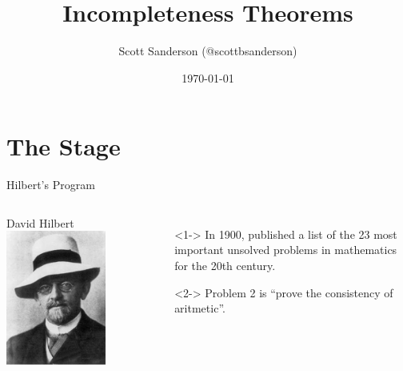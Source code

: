 \documentclass{beamer}
\title{\godels{} Incompleteness Theorems}
\date{\today}
\author{Scott Sanderson (@scottbsanderson)}
\institute{Papers We Love - Boston}
\begin{document}
\maketitle

\section{The Stage}

\begin{frame}{Hilbert's Program}
  \begin{columns}
    \begin{block}{David Hilbert}
      \includegraphics[width=0.75\textwidth]{images/hilbert.jpg}
    \end{block}

    \begin{itemize}
    \item[]<1-> In 1900, published a list of the 23 most important unsolved
      problems in mathematics for the 20th century.
    \item[]<2-> Problem 2 is ``prove the consistency of aritmetic''.
    \end{itemize}

  \end{columns}
\end{frame}
\end{document}
